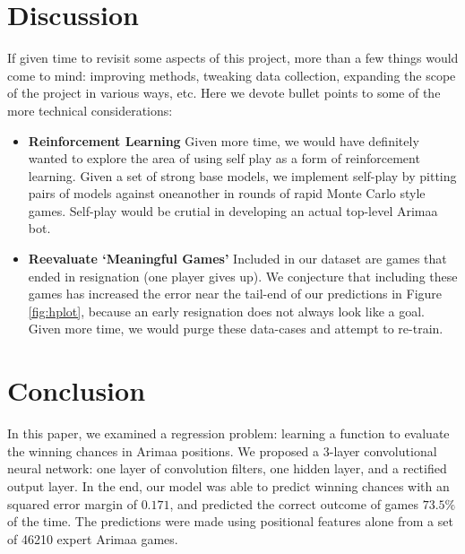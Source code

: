 \documentclass{article}
\begin{document}
\section{Discussion}

If given time to revisit some aspects of this project, more than a few things would come to mind: improving methods, tweaking data collection, expanding the scope of the project in various ways, etc.  Here we devote bullet points to some of the more technical considerations:

\begin{itemize}
\item \textbf{Reinforcement Learning} Given more time, we would have definitely wanted to explore the area of using self play as a form of reinforcement learning.  Given a set of strong base models, we implement self-play by pitting pairs of models against oneanother in rounds of rapid Monte Carlo style games.  Self-play would be crutial in developing an actual top-level Arimaa bot.

\item \textbf{Reevaluate `Meaningful Games'} Included in our dataset are games that ended in resignation (one player gives up).  We conjecture that including these games has increased the error near the tail-end of our predictions in Figure \ref{fig:hplot}, because an early resignation does not always look like a goal.  Given more time, we would purge these data-cases and attempt to re-train.
\end{itemize}

\section{Conclusion}

In this paper, we examined a regression problem: learning a function to evaluate the winning chances in Arimaa positions.  We proposed a 3-layer convolutional neural network: one layer of convolution filters, one hidden layer, and a rectified output layer.  In the end, our model was able to predict winning chances with an squared error margin of $0.171$, and predicted the correct outcome of games $73.5\%$ of the time.  The predictions were made using positional features alone from a set of 46210 expert Arimaa games.
\end{document}
